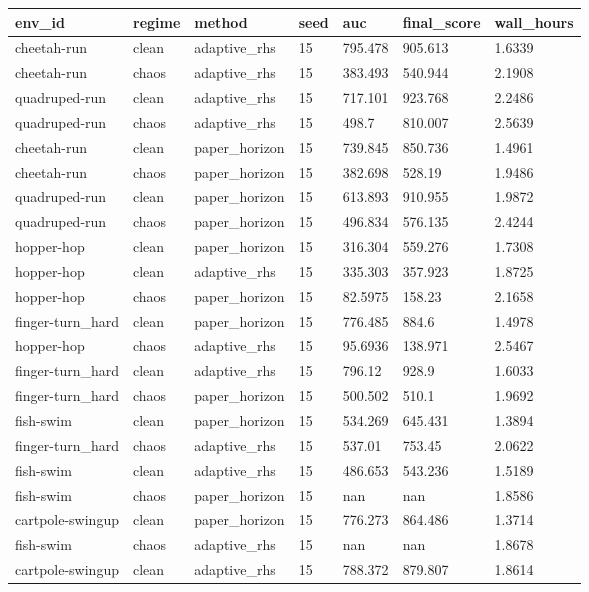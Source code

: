 \begin{tabular}{lllllll}
\toprule
env\_id & regime & method & seed & auc & final\_score & wall\_hours \\
\midrule
cheetah-run & clean & adaptive\_rhs & 15 & 795.478 & 905.613 & 1.6339 \\
cheetah-run & chaos & adaptive\_rhs & 15 & 383.493 & 540.944 & 2.1908 \\
quadruped-run & clean & adaptive\_rhs & 15 & 717.101 & 923.768 & 2.2486 \\
quadruped-run & chaos & adaptive\_rhs & 15 & 498.7 & 810.007 & 2.5639 \\
cheetah-run & clean & paper\_horizon & 15 & 739.845 & 850.736 & 1.4961 \\
cheetah-run & chaos & paper\_horizon & 15 & 382.698 & 528.19 & 1.9486 \\
quadruped-run & clean & paper\_horizon & 15 & 613.893 & 910.955 & 1.9872 \\
quadruped-run & chaos & paper\_horizon & 15 & 496.834 & 576.135 & 2.4244 \\
hopper-hop & clean & paper\_horizon & 15 & 316.304 & 559.276 & 1.7308 \\
hopper-hop & clean & adaptive\_rhs & 15 & 335.303 & 357.923 & 1.8725 \\
hopper-hop & chaos & paper\_horizon & 15 & 82.5975 & 158.23 & 2.1658 \\
finger-turn\_hard & clean & paper\_horizon & 15 & 776.485 & 884.6 & 1.4978 \\
hopper-hop & chaos & adaptive\_rhs & 15 & 95.6936 & 138.971 & 2.5467 \\
finger-turn\_hard & clean & adaptive\_rhs & 15 & 796.12 & 928.9 & 1.6033 \\
finger-turn\_hard & chaos & paper\_horizon & 15 & 500.502 & 510.1 & 1.9692 \\
fish-swim & clean & paper\_horizon & 15 & 534.269 & 645.431 & 1.3894 \\
finger-turn\_hard & chaos & adaptive\_rhs & 15 & 537.01 & 753.45 & 2.0622 \\
fish-swim & clean & adaptive\_rhs & 15 & 486.653 & 543.236 & 1.5189 \\
fish-swim & chaos & paper\_horizon & 15 & nan & nan & 1.8586 \\
cartpole-swingup & clean & paper\_horizon & 15 & 776.273 & 864.486 & 1.3714 \\
fish-swim & chaos & adaptive\_rhs & 15 & nan & nan & 1.8678 \\
cartpole-swingup & clean & adaptive\_rhs & 15 & 788.372 & 879.807 & 1.8614 \\

\end{tabular}
